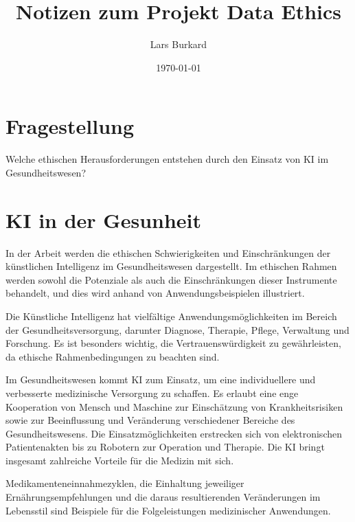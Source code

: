 \documentclass{article}
\title{Notizen zum Projekt Data Ethics}
\author{Lars Burkard}
\date{\today}
\begin{document}
\maketitle


\tableofcontents

\section{Fragestellung
    \label{sec:fragestellung}}


    Welche ethischen Herausforderungen entstehen durch den Einsatz von KI im Gesundheitswesen?

\section{KI in der Gesunheit}
In der Arbeit werden die ethischen Schwierigkeiten und Einschränkungen der künstlichen Intelligenz im Gesundheitswesen dargestellt. Im ethischen Rahmen werden sowohl die Potenziale als auch die Einschränkungen dieser Instrumente behandelt, und dies wird anhand von Anwendungsbeispielen illustriert.

\vspace{2mm}Die Künstliche Intelligenz hat vielfältige Anwendungsmöglichkeiten im Bereich der Gesundheitsversorgung, darunter Diagnose, Therapie, Pflege, Verwaltung und Forschung. Es ist besonders wichtig, die Vertrauenswürdigkeit zu gewährleisten, da ethische Rahmenbedingungen zu beachten sind.

\vspace{2mm}Im Gesundheitswesen kommt KI zum Einsatz, um eine individuellere und verbesserte medizinische Versorgung zu schaffen. Es erlaubt eine enge Kooperation von Mensch und Maschine zur Einschätzung von Krankheitsrisiken sowie zur Beeinflussung und Veränderung verschiedener Bereiche des Gesundheitswesens. Die Einsatzmöglichkeiten erstrecken sich von elektronischen Patientenakten bis zu Robotern zur Operation und Therapie. Die KI bringt insgesamt zahlreiche Vorteile für die Medizin mit sich.

\vspace{2mm}Medikamenteneinnahmezyklen, die Einhaltung jeweiliger Ernährungsempfehlungen und die daraus resultierenden Veränderungen im Lebensstil sind Beispiele für die Folgeleistungen medizinischer Anwendungen. 
\end{document}
